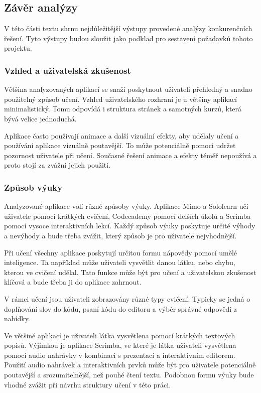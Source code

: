 \subsection{Závěr analýzy}

V této části textu shrnu nejdůležitější výstupy provedené analýzy konkurenčních řešení. Tyto výstupy budou sloužit jako podklad pro sestavení požadavků tohoto projektu.

\subsubsection{Vzhled a uživatelská zkušenost}

Většina analyzovaných aplikací se snaží poskytnout uživateli přehledný a snadno použitelný způsob učení. Vzhled uživatelského rozhraní je u většiny aplikací minimalistický. Tomu odpovídá i struktura stránek a samotných kurzů, která bývá velice jednoduchá.

Aplikace často používají animace a další vizuální efekty, aby udělaly učení a používání aplikace vizuálně poutavější. To může potenciálně pomoci udržet pozornost uživatele při učení. Současné řešení animace a efekty téměř nepoužívá a proto stojí za zvážní jejich použití.

\subsubsection{Způsob výuky}

Analyzované aplikace volí různé způsoby výuky. Aplikace Mimo a Sololearn učí uživatele pomocí krátkých cvičení, Codecademy pomocí delších úkolů a Scrimba pomocí vysoce interaktivních lekcí. Každý způsob výuky poskytuje určité výhody a nevýhody a bude třeba zvážit, který způsob je pro uživatele nejvhodnější.

Při učení všechny aplikace poskytují určitou formu nápovědy pomocí umělé inteligence. Ta například může uživateli vysvětlit danou látku, nebo chybu, kterou ve cvičení udělal. Tato funkce může být pro učení a uživatelskou zkušenost klíčová a bude třeba ji do aplikace zahrnout.

V rámci učení jsou uživateli zobrazovány různé typy cvičení. Typicky se jedná o doplňování slov do kódu, psaní kódu do editoru a výběr správné odpovědi z nabídky.

Ve většině aplikací je uživateli látka vysvětlena pomocí krátkých textových popisů. Výjimkou je aplikace Scrimba, ve které je látka uživateli vysvětlena pomocí audio nahrávky v kombinaci s prezentací a interaktivním editorem. Použití audio nahrávek a interaktivních prvků může být pro uživatele potenciálně poutavější a srozumitelnější, než pouhé čtení textu. Podobnou formu výuky bude vhodné zvážit při návrhu struktury učení v této práci.

